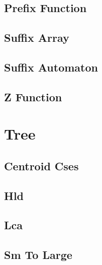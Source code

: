 \documentclass[9pt,portrait,twocolumn,a4paper,notitlepage]{article}
\newcommand\cppfile[2][]{%
\ifstrempty{#1}{}{}%
}
\begin{document}
\subsection{Prefix Function}
\cppfile{strings_clean/prefix_function.cpp}

\subsection{Suffix Array}
\cppfile{strings_clean/suffix_array.cpp}

\subsection{Suffix Automaton}
\cppfile{strings_clean/suffix_automaton.cpp}


\subsection{Z Function}
\cppfile{strings_clean/z_function.cpp}


\section{Tree}

\subsection{Centroid Cses}
\cppfile{tree_clean/centroid_cses.cpp}

\subsection{Hld}
\cppfile{tree_clean/hld.cpp}

\subsection{Lca}
\cppfile{tree_clean/LCA.cpp}

\subsection{Sm To Large}
\cppfile{tree_clean/sm_to_large.cpp}
\end{document}

